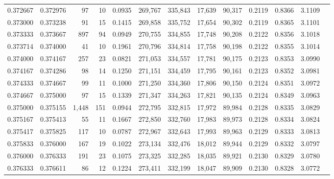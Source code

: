 \begin{tabular}{rrrrrrrrrrrrr}
0.372667 & 0.372976 &    97 &  10 &                                     0.0935 & 269,767 & 335,843 &  17,639 &  90,317 & 0.2119 & 0.8366 & 3.1109 \\
0.373000 & 0.373238 &    91 &  15 &                                     0.1415 & 269,858 & 335,752 &  17,654 &  90,302 & 0.2119 & 0.8365 & 3.1101 \\
0.373333 & 0.373667 &   897 &  94 &                                     0.0949 & 270,755 & 334,855 &  17,748 &  90,208 & 0.2122 & 0.8356 & 3.1018 \\
0.373714 & 0.374000 &    41 &  10 &                                     0.1961 & 270,796 & 334,814 &  17,758 &  90,198 & 0.2122 & 0.8355 & 3.1014 \\
0.374000 & 0.374167 &   257 &  23 &                                     0.0821 & 271,053 & 334,557 &  17,781 &  90,175 & 0.2123 & 0.8353 & 3.0990 \\
0.374167 & 0.374286 &    98 &  14 &                                     0.1250 & 271,151 & 334,459 &  17,795 &  90,161 & 0.2123 & 0.8352 & 3.0981 \\
0.374333 & 0.374667 &    99 &  11 &                                     0.1000 & 271,250 & 334,360 &  17,806 &  90,150 & 0.2124 & 0.8351 & 3.0972 \\
0.374667 & 0.375000 &    97 &  15 &                                     0.1339 & 271,347 & 334,263 &  17,821 &  90,135 & 0.2124 & 0.8349 & 3.0963 \\
0.375000 & 0.375155 & 1,448 & 151 &                                     0.0944 & 272,795 & 332,815 &  17,972 &  89,984 & 0.2128 & 0.8335 & 3.0829 \\
0.375167 & 0.375413 &    55 &  11 &                                     0.1667 & 272,850 & 332,760 &  17,983 &  89,973 & 0.2128 & 0.8334 & 3.0824 \\
0.375417 & 0.375825 &   117 &  10 &                                     0.0787 & 272,967 & 332,643 &  17,993 &  89,963 & 0.2129 & 0.8333 & 3.0813 \\
0.375833 & 0.376000 &   167 &  19 &                                     0.1022 & 273,134 & 332,476 &  18,012 &  89,944 & 0.2129 & 0.8332 & 3.0797 \\
0.376000 & 0.376333 &   191 &  23 &                                     0.1075 & 273,325 & 332,285 &  18,035 &  89,921 & 0.2130 & 0.8329 & 3.0780 \\
0.376333 & 0.376611 &    86 &  12 &                                     0.1224 & 273,411 & 332,199 &  18,047 &  89,909 & 0.2130 & 0.8328 & 3.0772 \\

\end{tabular}
